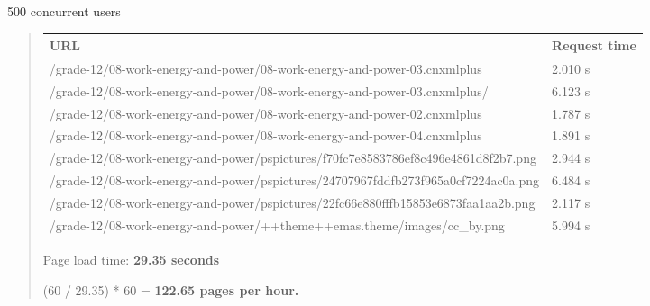 \documentclass[letterpaper,10pt,english]{sphinxmanual}
\begin{document}
500 concurrent users
\begin{quote}

\begin{tabulary}{\linewidth}{|L|L|}
\hline
\textbf{\relax 
URL
} & \textbf{\relax 
Request time
}\\\hline

/grade-12/08-work-energy-and-power/08-work-energy-and-power-03.cnxmlplus
 & 
2.010 s
\\\hline

/grade-12/08-work-energy-and-power/08-work-energy-and-power-03.cnxmlplus/
 & 
6.123 s
\\\hline

/grade-12/08-work-energy-and-power/08-work-energy-and-power-02.cnxmlplus
 & 
1.787 s
\\\hline

/grade-12/08-work-energy-and-power/08-work-energy-and-power-04.cnxmlplus
 & 
1.891 s
\\\hline

/grade-12/08-work-energy-and-power/pspictures/f70fc7e8583786ef8c496e4861d8f2b7.png
 & 
2.944 s
\\\hline

/grade-12/08-work-energy-and-power/pspictures/24707967fddfb273f965a0cf7224ac0a.png
 & 
6.484 s
\\\hline

/grade-12/08-work-energy-and-power/pspictures/22fc66e880fffb15853e6873faa1aa2b.png
 & 
2.117 s
\\\hline

/grade-12/08-work-energy-and-power/++theme++emas.theme/images/cc\_by.png
 & 
5.994 s
\\\hline
\end{tabulary}


Page load time: \textbf{29.35 seconds}

(60 / 29.35) * 60 = \textbf{122.65 pages per hour.}
\end{quote}
\end{document}

